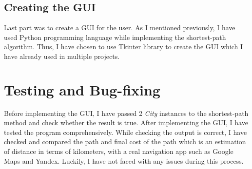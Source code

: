 \documentclass{IEEEtran}
\begin{document}
\subsection{Creating the GUI}
Last part was to create a GUI for the user. As I mentioned previously, I have used Python programming language while implementing the shortest-path algorithm. Thus, I have chosen to use Tkinter library to create the GUI which I have already used in multiple projects.

\section{Testing and Bug-fixing}
Before implementing the GUI, I have passed 2 \textit{City} instances to the shortest-path method and check whether the result is true. After implementing the GUI, I have tested the program comprehensively. While checking the output is correct, I have checked and compared the path and final cost of the path which is an estimation of distance in terms of kilometers, with a real navigation app such as Google Maps and Yandex. Luckily, I have not faced with any issues during this process.



	
	
	
% 
\end{document}

